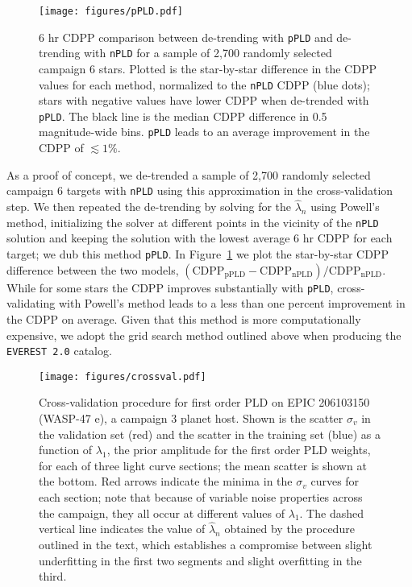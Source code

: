 \documentclass[]{emulateapj}
\begin{document}
\begin{figure}[hbt]
  \begin{center}
      \texttt{[image: figures/pPLD.pdf]}
       \caption{6 hr CDPP comparison between de-trending with \texttt{pPLD} and
                de-trending with \texttt{nPLD} for a sample of 2,700 randomly selected campaign 6
                stars. Plotted is the star-by-star difference in the CDPP values for each method,
                normalized to the \texttt{nPLD} CDPP (blue dots); stars with negative values have lower CDPP 
                when de-trended with \texttt{pPLD}. The black line is the median CDPP difference
                in 0.5 magnitude-wide bins. \texttt{pPLD} leads to an average improvement
                in the CDPP of ${\lesssim}1\%$.}
     \label{fig:pPLD}
  \end{center}
\end{figure}

As a proof of concept, we de-trended a sample of 2,700 randomly selected campaign 6 targets
with \texttt{nPLD} using this approximation in the cross-validation step. 
We then repeated the de-trending by
solving for the $\hat{\lambda}_n$ using Powell's method, initializing the solver at different
points in the vicinity of the \texttt{nPLD} solution and keeping the solution with the lowest
average 6 hr CDPP \citep[combined differential photometric precision;][]{Christiansen12} for each target; we dub this method 
\texttt{pPLD}. In Figure~\ref{fig:pPLD} we plot
the star-by-star CDPP difference between the two models, 
$\mathrm{(CDPP_{pPLD} - CDPP_{nPLD})/CDPP_{nPLD}}$. While for some stars the CDPP improves
substantially with \texttt{pPLD}, cross-validating with Powell's method 
leads to a less than one percent improvement in the CDPP on average. Given that this method
is more computationally expensive, we adopt the grid search method outlined above when
producing the \texttt{EVEREST 2.0} catalog.

\begin{figure}[hbt]
  \begin{center}
      \texttt{[image: figures/crossval.pdf]}
       \caption{Cross-validation procedure for first order PLD on EPIC 206103150
       (WASP-47 e), a campaign 3 planet host. Shown is the scatter $\sigma_v$ in the validation
       set (red) and the scatter in the training set (blue) as a function of $\lambda_1$,
       the prior amplitude for the first order PLD weights, for each of three light curve
       sections; the mean scatter is shown at the bottom. Red arrows indicate the minima
       in the $\sigma_v$ curves for each section; note that because of variable noise
       properties across the campaign, they all occur at different values of $\lambda_1$.
       The dashed vertical line indicates the value of $\hat{\lambda}_n$ obtained by the
       procedure outlined in the text, which establishes a compromise between 
       slight underfitting in the first two segments and slight overfitting in the
       third.
       }
     \label{fig:crossval}
  \end{center}
\end{figure}
\end{document}
